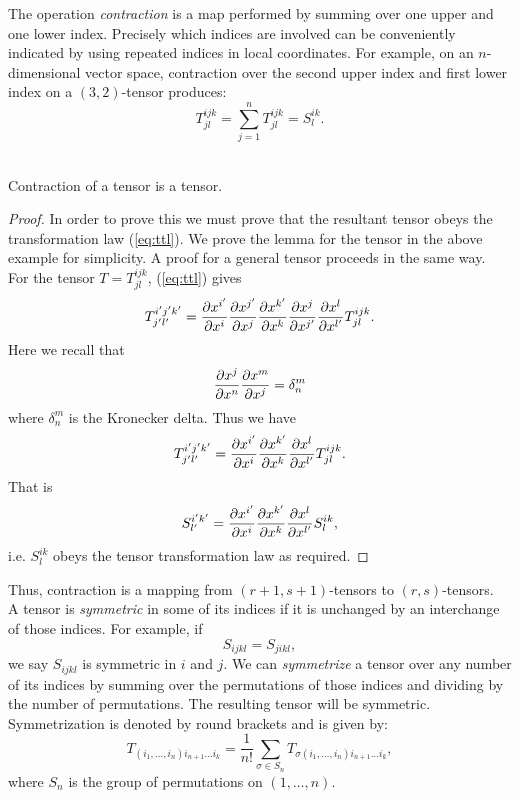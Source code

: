 The operation \textit{contraction} is a map performed by summing over one upper
and one lower index. Precisely which indices are involved can be conveniently
indicated by using repeated indices in local coordinates. For example, on an
$n$-dimensional vector space, contraction over the second upper index and first
lower index on a $(3,2)$-tensor produces:
\[ T^{ijk}_{jl}=\sum^n_{j=1}T^{ijk}_{jl} = S^{ik}_{l}.\]\\

\begin{lemma}
Contraction of a tensor is a tensor.
\end{lemma}
\begin{proof}
In order to prove this we must prove that the resultant tensor obeys the
transformation law (\ref{eq:ttl}). We prove the lemma for the tensor in the
above example for simplicity. A proof for a general tensor proceeds in the same
way. \\

For the tensor $T=T^{ijk}_{jl}$, (\ref{eq:ttl}) gives
\[T^{i'j'k'}_{j'l'}=\frac{{\partial} x^{i'}}{{\partial} x^i}\frac{{\partial} x^{j'}}{{\partial}
x^j}\frac{{\partial} x^{k'}}{{\partial} x^k}\frac{{\partial} x^{j}}{{\partial} x^{j'}}\frac{{\partial} x^{l}}{{\partial}
x^{l'}}T^{ijk}_{jl}. \]
Here we recall that 
\[ \frac{{\partial} x^{j}}{{\partial} x^n}\frac{{\partial} x^{m}}{{\partial} x^j}=\delta^m_n \]
where $\delta^m_n$ is the Kronecker delta. Thus we have 
\[T^{i'j'k'}_{j'l'}=\frac{{\partial} x^{i'}}{{\partial} x^i}\frac{{\partial} x^{k'}}{{\partial}
x^k}\frac{{\partial} x^{l}}{{\partial} x^{l'}}T^{ijk}_{jl}.\]
That is
\[S^{i'k'}_{l'}=\frac{{\partial} x^{i'}}{{\partial} x^i}\frac{{\partial} x^{k'}}{{\partial} x^k}\frac{{\partial}
x^{l}}{{\partial} x^{l'}}S^{ik}_{l}, \]
i.e. $S^{ik}_{l}$ obeys the tensor transformation law as required.
\end{proof}
Thus, contraction is a mapping from $(r+1,s+1)$-tensors to $(r,s)$-tensors. \\

A tensor is \textit{symmetric} in some of its indices if it is unchanged by an
interchange of those indices. For example, if 
\[ S_{ijkl}=S_{jikl},\]
we say $S_{ijkl}$ is symmetric in $i$ and $j$. We can \textit{symmetrize} a
tensor over any number of its indices by summing over the permutations of those
indices and dividing by the number of permutations. The resulting tensor will be
symmetric. Symmetrization is denoted by round brackets and is given by:
\begin{equation} T_{(i_1,\dots,i_n)i_{n+1}\dots i_k} = \frac{1}{n!}\sum_{\sigma
\in S_n}T_{\sigma(i_1,\dots,i_n)i_{n+1}\dots i_k}, \label{eq:symmetrization}
\end{equation}
where $S_n$ is the group of permutations on $(1,\dots,n)$. \\

